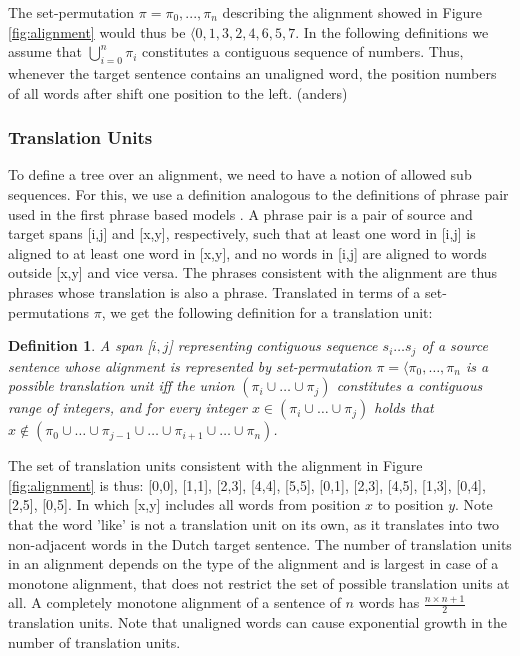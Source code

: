 \documentclass{report}
\theoremstyle{definition}
\theoremstyle{plain}
\newtheorem{definition}{Definition}
\begin{document}
The set-permutation $\pi = \pi_0, ..., \pi_n$ describing the alignment showed in Figure \ref{fig:alignment} would thus be $\langle {0}, {1}, {3}, {2,4}, {6}, {5}, {7}$. In the following definitions we assume that $\bigcup_{i=0}^n \pi_i$ constitutes a contiguous sequence of numbers. Thus, whenever the target sentence contains an unaligned word, the position numbers of all words after shift one position to the left. (anders) 

\subsubsection{Translation Units} To define a tree over an alignment, we need to have a notion of allowed sub sequences. For this, we use a definition analogous to the definitions of phrase pair used in the first phrase based models \citep{och2004alignment}. A phrase pair is a pair of source and target spans [i,j] and [x,y], respectively, such that at least one word in [i,j] is aligned to at least one word in [x,y], and no words in [i,j] are aligned to words outside [x,y] and vice versa. The phrases consistent with the alignment are thus phrases whose translation is also a phrase. Translated in terms of a set-permutations $\pi$, we get the following definition for a translation unit:

\begin{definition}
A span [$i,j$] representing contiguous sequence $s_i\ldots s_j$ of a source sentence whose alignment is represented by set-permutation $\pi = \langle\pi_0 ,\ldots ,\pi_n$ is a possible translation unit iff the union $(\pi_i\cup \ldots \cup \pi_j)$ constitutes a contiguous range of integers, and for every integer $x \in (\pi_i\cup \ldots \cup\pi_j)$ holds that  $x \notin (\pi_0\cup \ldots \cup \pi_{j-1} \cup \ldots\cup\pi_{i+1}\cup\ldots\cup \pi_n)$.
\end{definition}

The set of translation units consistent with the alignment in Figure \ref{fig:alignment} is thus: {[0,0], [1,1], [2,3], [4,4], [5,5], [0,1], [2,3], [4,5], [1,3], [0,4], [2,5], [0,5]}. In which [x,y] includes all words from position $x$ to position $y$. Note that the word 'like' is not a translation unit on its own, as it translates into two non-adjacent words in the Dutch target sentence. The number of translation units in an alignment depends on the type of the alignment and is largest in case of a monotone alignment, that does not restrict the set of possible translation units at all. A completely monotone alignment of a sentence of $n$ words has $\frac{n\times n+1}{2}$ translation units. Note that unaligned words can cause exponential growth in the number of translation units.
\end{document}
